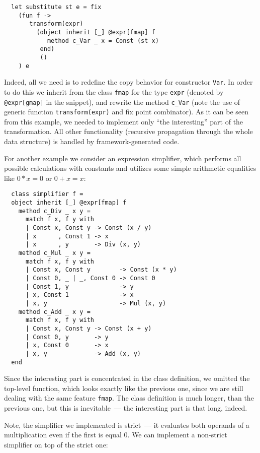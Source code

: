 \documentclass[twocolumn,8pt]{extarticle}
\newcommand{\cd}[1]{\texttt{#1}}
\begin{document}
\begin{lstlisting}
  let substitute st e = fix
    (fun f ->
       transform(expr)
         (object inherit [_] @expr[fmap] f
            method c_Var _ x = Const (st x)
          end)
          ()
    ) e
\end{lstlisting}

Indeed, all we need is to redefine the copy behavior for constructor \cd{Var}. In order to do this we inherit from the class \cd{fmap} for the type
\cd{expr} (denoted by \cd{@expr[gmap]} in the snippet), and rewrite the method \cd{c\_Var} (note the use of generic function \cd{transform(expr)} and
fix point combinator). As it can be seen from this example, we needed to implement only ``the interesting'' part of the transformation. All other
functionality (recursive propagation through the whole data structure) is handled by framework-generated code.

For another example we consider an expression simplifier, which performs all possible calculations with constants and utilizes some
simple arithmetic equalities like $0*x=0$ or $0+x=x$:

\begin{lstlisting}
  class simplifier f =
  object inherit [_] @expr[fmap] f
    method c_Div _ x y =
      match f x, f y with
      | Const x, Const y -> Const (x / y)
      | x      , Const 1 -> x
      | x      , y       -> Div (x, y)
    method c_Mul _ x y =
      match f x, f y with
      | Const x, Const y        -> Const (x * y)
      | Const 0, _ | _, Const 0 -> Const 0
      | Const 1, y              -> y
      | x, Const 1              -> x
      | x, y                    -> Mul (x, y)
    method c_Add _ x y =
      match f x, f y with
      | Const x, Const y -> Const (x + y)
      | Const 0, y       -> y
      | x, Const 0       -> x
      | x, y             -> Add (x, y)
  end
\end{lstlisting}

Since the interesting part is concentrated in the class definition, we omitted the top-level function, which looks exactly like the previous one,
since we are still dealing with the same feature \cd{fmap}. The class definition is much longer, than the previous one, but this is
inevitable~--- the interesting part is that long, indeed.

Note, the simplifier we implemented is strict~--- it evaluates both operands of a multiplication even if the first is equal 0. We can implement
a non-strict simplifier on top of the strict one:
\end{document}
